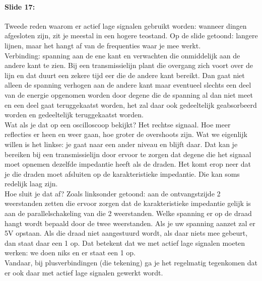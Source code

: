 \documentclass[10pt,a4paper]{book}
\begin{document}
\paragraph{Slide 17:} Tweede reden waarom er actief lage signalen gebruikt worden: wanneer dingen afgesloten zijn, zit je meestal in een hogere teostand. Op de slide getoond: langere lijnen, maar het hangt af van de frequenties waar je mee werkt.\\
Verbinding: spanning aan de ene kant en verwachten die onmiddelijk aan de andere kant te zien. Bij een transmissielijn plant die overgang zich voort over de lijn en dat duurt een zekere tijd eer die de andere kant bereikt. Dan gaat niet alleen de spanning verhogen aan de andere kant maar eventueel slechts een deel van de energie opgenomen worden door degene die de spanning al dan niet meet en een deel gaat teruggekaatst worden, het zal daar ook gedeeltelijk geabsorbeerd worden en gedeeltelijk teruggekaatst worden.\\
Wat als je dat op een oscilloscoop bekijkt? Het rechtse signaal. Hoe meer reflecties er heen en weer gaan, hoe groter de overshoots zijn. Wat we eigenlijk willen is het linkse: je gaat naar een ander niveau en blijft daar. Dat kan je bereiken bij een transmissielijn door ervoor te zorgen dat degene die het signaal moet opnemen dezelfde impedantie heeft als de draden. Het komt erop neer dat je die draden moet afsluiten op de karakteristieke impedantie. Die kan soms redelijk laag zijn. \\
Hoe sluit je dat af? Zoals linksonder getoond: aan de ontvangstzijde 2 weerstanden zetten die ervoor zorgen dat de karakteristieke impedantie gelijk is aan de parallelschakeling van die 2 weerstanden. Welke spanning er op de draad hangt wordt bepaald door de twee weerstanden. Als je uw spanning aanzet zal er 5V opstaan. Als die draad niet aangestuurd wordt, als daar niets mee gebeurt, dan staat daar een 1 op. Dat betekent dat we met actief lage signalen moeten werken: we doen niks en er staat een 1 op.\\
Vandaar, bij plusverbindingen (die tekening) ga je het regelmatig tegenkomen dat er ook daar met actief lage signalen gewerkt wordt. 
\end{document}
